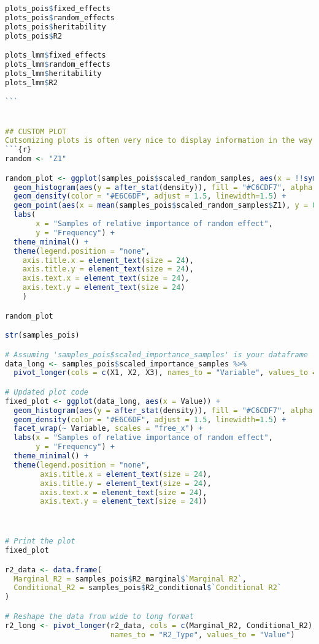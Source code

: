 \begin{lstlisting}[language=R, caption=Usage of the BayesianImpGLMM package with plots and examples.]
plots_pois$fixed_effects
plots_pois$random_effects
plots_pois$heritability
plots_pois$R2

plots_lmm$fixed_effects
plots_lmm$random_effects
plots_lmm$heritability
plots_lmm$R2

```


## CUSTOM PLOT
Cutsomizing plots is often very nice to display information in the way you want it. Therefore, we show how one can customize the plots using ggplot2 based on the samples drawn.
```{r}
random <- "Z1"

random_plot <- ggplot(samples_pois$scaled_random_samples, aes(x = !!sym(random))) +
  geom_histogram(aes(y = after_stat(density)), fill = "#C6CDF7", alpha = 0.7, bins = 40, color = "black") +
  geom_density(color = "#E6C6DF", adjust = 1.5, linewidth=1.5) +
  geom_point(aes(x = mean(samples_pois$scaled_random_samples$Z1), y = 0), color = "#E6C6DF", size = 4) +
  labs(
       x = "Samples of relative importance of random effect",
       y = "Frequency") +
  theme_minimal() +
  theme(legend.position = "none",
    axis.title.x = element_text(size = 24),
    axis.title.y = element_text(size = 24),
    axis.text.x = element_text(size = 24),
    axis.text.y = element_text(size = 24)
    ) 

random_plot

str(samples_pois)

# Assuming 'samples_pois$scaled_importance_samples' is your dataframe
data_long <- samples_pois$scaled_importance_samples %>%
  pivot_longer(cols = c(X1, X2, X3), names_to = "Variable", values_to = "Value")

# Updated plot code
fixed_plot <- ggplot(data_long, aes(x = Value)) +
  geom_histogram(aes(y = after_stat(density)), fill = "#C6CDF7", alpha = 0.7, color = "black") +
  geom_density(color = "#E6C6DF", adjust = 1.5, linewidth=1.5) +
  facet_wrap(~ Variable, scales = "free_x") +
  labs(x = "Samples of relative importance of random effect",
       y = "Frequency") +
  theme_minimal() +
  theme(legend.position = "none",
        axis.title.x = element_text(size = 24),
        axis.title.y = element_text(size = 24),
        axis.text.x = element_text(size = 24),
        axis.text.y = element_text(size = 24))



# Print the plot
fixed_plot

r2_data <- data.frame(
  Marginal_R2 = samples_pois$R2_marginal$`Marginal R2`,
  Conditional_R2 = samples_pois$R2_conditional$`Conditional R2`
)

# Reshape the data from wide to long format
r2_long <- pivot_longer(r2_data, cols = c(Marginal_R2, Conditional_R2),
                        names_to = "R2_Type", values_to = "Value")


\end{lstlisting}
